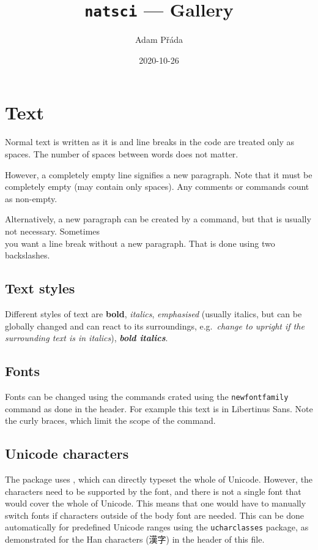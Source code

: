 \documentclass[11pt]{article}
\title{\texttt{natsci} --- Gallery}
\author{Adam Přáda}
\date{2020-10-26}
\begin{document}
\pagestyle{fancy}
\maketitle



\section{Text}
Normal text is written as it is
and line breaks
in
the
code
are treated only as spaces. The number of spaces                            between words does not matter.

However, a completely empty line signifies a new paragraph. Note that it must be completely empty (may contain only spaces). Any comments or commands count as non-empty. \par Alternatively, a new paragraph can be created by a command, but that is usually not necessary. Sometimes\\ you want a line break without a new paragraph. That is done using two backslashes.

\subsection{Text styles}
Different styles of text are \textbf{bold}, \textit{italics}, \emph{emphasised} (usually italics, but can be globally changed and can react to its surroundings, e.g.\ \textit{change to \emph{upright} if the surrounding text is in italics}), \textbf{\textit{bold italics}}.

\subsection{Fonts}
Fonts can be changed using the commands crated using the \texttt{newfontfamily} command as done in the header. {\libertinussans For example this text is in Libertinus Sans.} Note the curly braces, which limit the scope of the command.

\subsection{Unicode characters}
The package uses , which can directly typeset the whole of Unicode. However, the characters need to be supported by the font, and there is not a single font that would cover the whole of Unicode. This means that one would have to manually switch fonts if characters outside of the body font are needed. This can be done automatically for predefined Unicode ranges using the \texttt{ucharclasses} package, as demonstrated for the Han characters (漢字) in the header of this file.
\end{document}
